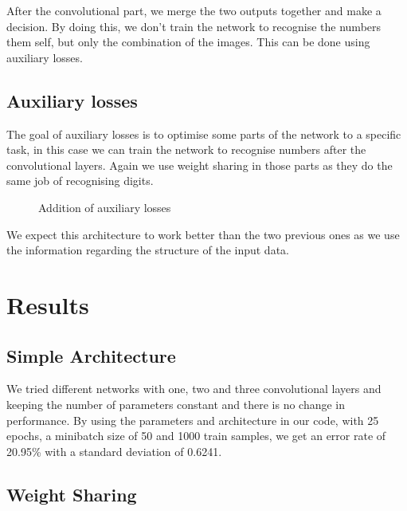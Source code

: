 \documentclass{article}
\begin{document}
After the convolutional part, we merge the two outputs together and make a decision. By doing this, we don't train the network to recognise the numbers them self, but only the combination of the images. This can be done using auxiliary losses. 

\subsection{Auxiliary losses}

The goal of auxiliary losses is to optimise some parts of the network to a specific task, in this case we can train the network to recognise numbers after the convolutional layers. Again we use weight sharing in those parts as they do the same job of recognising digits.

\begin{figure}[H]
\caption{Addition of auxiliary losses}
\end{figure}

We expect this architecture to work better than the two previous ones as we use the information regarding the structure of the input data. 

\section{Results}

\subsection{Simple Architecture}
We tried different networks with one, two and three convolutional layers and keeping the number of parameters constant and there is no change in performance. By using the parameters and architecture in our code, with 25 epochs, a minibatch size of 50 and 1000 train samples, we get an error rate of 20.95\% with a standard deviation of 0.6241.

\subsection{Weight Sharing}
\end{document}
